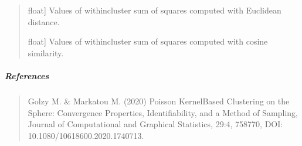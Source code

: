 \documentclass[letterpaper,10pt,english,openany,oneside]{sphinxmanual}
\begin{document}
\begin{fulllineitems}
\begin{quote}
\begin{description}
\sphinxlineitem{euclidean\_wcss\_}{[}float{]}
\sphinxAtStartPar
Values of within\sphinxhyphen{}cluster sum of squares computed with 
Euclidean distance.

\sphinxlineitem{cosine\_wcss\_}{[}float{]}
\sphinxAtStartPar
Values of within\sphinxhyphen{}cluster sum of squares computed with 
cosine similarity.

\end{description}
\end{quote}


\subparagraph{References}
\label{\detokenize{api_reference/generated/QuadratiK.spherical_clustering.PKBC:references}}\begin{quote}

\sphinxAtStartPar
Golzy M. \& Markatou M. (2020) Poisson Kernel\sphinxhyphen{}Based 
Clustering on the Sphere: Convergence Properties, Identifiability, 
and a Method of Sampling, Journal of Computational and Graphical Statistics, 
29:4, 758\sphinxhyphen{}770, DOI: 10.1080/10618600.2020.1740713.
\end{quote}



\end{fulllineitems}
\end{document}
